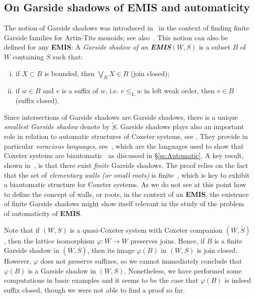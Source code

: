 \documentclass[A4paper, oneside]{amsart}
\newcommand{\EMIS}{\textnormal{\bf EMIS}\xspace}
\theoremstyle{definition}
\begin{document}
\subsection{On Garside shadows of \EMIS and automaticity} \label{ss: Garside}  
The notion of Garside shadows was introduced in~\cite{DyHo16} in the context of finding finite Garside families for Artin-Tits monoids; see also~\cite{DDH14}. This notion can also be defined for any \EMIS:    A {\em Garside shadow of an \EMIS $(W,S)$} is a subset $B$ of $W$ containing $S$ such that:
    \begin{enumerate}[(i)]
    \item if $X\subset B$ is bounded, then $\bigvee_R X\in B$ (join closed);
    \item if $w\in B$ and $v$ is a suffix of $w$, i.e. $v\leq_L w$ in left weak order, then $v\in B$ (suffix closed).
    \end{enumerate}

Since intersections of Garside shadows are Garside shadows, there is a unique {\em smallest Garside shadow} denote by $\tilde S$. Garside shadows plays also an important role in relation to automatic structures of Coxeter systems, see \cite{PrYa24,RegPartition}. They provide in particular {\em voracious languages}, see~\cite{Sa25}, which are the languages used to show that Coxeter systems are biautomatic~\cite{OP22} as discussed in \S\ref{ss:Automatic}. A key result, shown in~\cite{DyHo16}, is that there exist {\em finite} Garside shadows. The proof relies on the fact that the set of {\em elementary walls (or small roots)} is finite~\cite{BH-par}, which is key to exhibit a biautomatic structure for Coxeter systems. As we do not see at this point how to define the concept of walls, or roots, in the context of an \EMIS, the existence of finite Garside shadows might show itself relevant in the study of the problem of automaticity of \EMIS.  

\smallskip

Note that if $(W,S)$ is a quasi-Coxeter system with Coxeter companion $(\overline{W}, \overline{S})$, then the lattice isomorphism $\varphi : \overline{W} \to W$ preserves joins. Hence, if $B$ is a finite Garside shadow in $(\overline{W}, \overline{S})$, then its image $\varphi(B)$ in $(W,S)$ is join closed. However, $\varphi$ does not preserve suffixes, so we cannot immediately conclude that $\varphi(B)$ is a Garside shadow in $(W,S)$. Nonetheless, we have performed some computations in basic examples and it seems to be the case that $\varphi(B)$ is indeed suffix closed, though we were not able to find a proof so far. 
\end{document}
